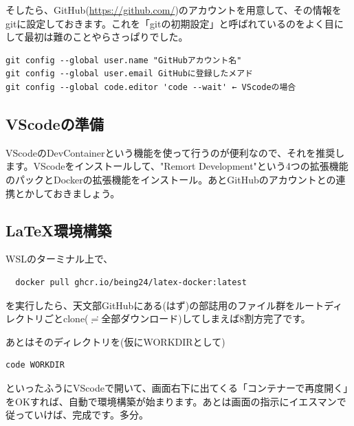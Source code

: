 \documentclass[../super_nova_20yy]{subfiles}
\begin{document}
そしたら、GitHub(\url{https://github.com/})のアカウントを用意して、その情報をgitに設定しておきます。これを「gitの初期設定」と呼ばれているのをよく目にして最初は難のことやらさっぱりでした。
\begin{lstlisting}
git config --global user.name "GitHubアカウント名"
git config --global user.email GitHubに登録したメアド
git config --global code.editor 'code --wait' ← VScodeの場合
\end{lstlisting}
\subsection{VScodeの準備}
VScodeのDevContainerという機能を使って行うのが便利なので、それを推奨します。VScodeをインストールして、"Remort Development"という4つの拡張機能のパックとDockerの拡張機能をインストール。あとGitHubのアカウントとの連携とかしておきましょう。
\subsection{\LaTeX 環境構築}
WSLのターミナル上で、
\begin{lstlisting}
  docker pull ghcr.io/being24/latex-docker:latest
\end{lstlisting}
を実行したら、天文部GitHubにある(はず)の部誌用のファイル群をルートディレクトリごとclone($\risingdotseq$全部ダウンロード)してしまえば8割方完了です。

あとはそのディレクトリを(仮にWORKDIRとして)
\begin{lstlisting}
code WORKDIR
\end{lstlisting}
といったふうにVScodeで開いて、画面右下に出てくる「コンテナーで再度開く」をOKすれば、自動で環境構築が始まります。あとは画面の指示にイエスマンで従っていけば、完成です。多分。
\end{document}
